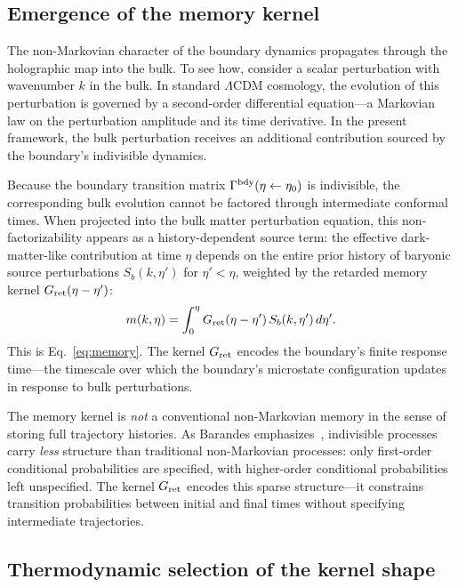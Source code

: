 \documentclass[aps,prd,twocolumn,superscriptaddress,nofootinbib]{revtex4-2}
\begin{document}
\subsection{Emergence of the memory kernel}

The non-Markovian character of the boundary dynamics propagates through the holographic map into the bulk. To see how, consider a scalar perturbation with wavenumber $k$ in the bulk. In standard $\Lambda$CDM cosmology, the evolution of this perturbation is governed by a second-order differential equation---a Markovian law on the perturbation amplitude and its time derivative. In the present framework, the bulk perturbation receives an additional contribution sourced by the boundary's indivisible dynamics.

Because the boundary transition matrix $\Gamma^{\rm bdy}(\eta \leftarrow \eta_0)$ is indivisible, the corresponding bulk evolution cannot be factored through intermediate conformal times. When projected into the bulk matter perturbation equation, this non-factorizability appears as a history-dependent source term: the effective dark-matter-like contribution at time $\eta$ depends on the entire prior history of baryonic source perturbations $S_b(k,\eta')$ for $\eta' < \eta$, weighted by the retarded memory kernel $G_{\rm ret}(\eta - \eta')$:
\begin{equation}
m(k,\eta) = \int_0^{\eta} G_{\rm ret}(\eta - \eta')\, S_b(k,\eta')\, d\eta'.
\label{eq:memory_kernel}
\end{equation}
This is Eq.~\eqref{eq:memory}. The kernel $G_{\rm ret}$ encodes the boundary's finite response time---the timescale over which the boundary's microstate configuration updates in response to bulk perturbations.

The memory kernel is \emph{not} a conventional non-Markovian memory in the sense of storing full trajectory histories. As Barandes emphasizes~\cite{Barandes2025SQC}, indivisible processes carry \emph{less} structure than traditional non-Markovian processes: only first-order conditional probabilities are specified, with higher-order conditional probabilities left unspecified. The kernel $G_{\rm ret}$ encodes this sparse structure---it constrains transition probabilities between initial and final times without specifying intermediate trajectories.

\subsection{Thermodynamic selection of the kernel shape}
\label{sec:lowpass}
\end{document}
